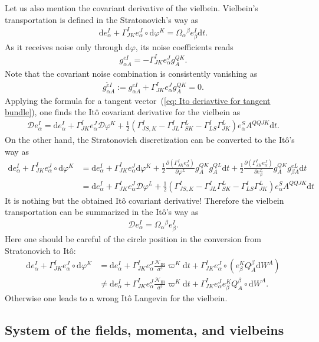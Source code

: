 \documentclass[aps, prd
, preprint
, nofootinbib 
, longbibliography
]{revtex4-1}
\newcommand{\pdif}[2]{\frac{\partial #1}{\partial #2}}
\newcommand{\dd}{\mathrm{d}}
\newcommand{\IR}{\mathrm{IR}}
\newcommand{\calD}{\mathcal{D}}
\newcommand{\calN}{\mathcal{N}}
\newcommand{\bae}[1]{\begin{align} #1 \end{align}}
\begin{document}
Let us also mention the covariant derivative of the vielbein.
Vielbein's transportation is defined in the Stratonovich's way as
\bae{
    \dd e^I_\alpha+\Gamma^I_{JK}e^J_\alpha\circ\dd\varphi^K=\Omega_\alpha{}^\beta e^I_\beta\dd t.
}
As it receives noise only through $\dd\varphi$, its noise coefficients reads
\bae{
    g^{eI}_{\alpha A}=-\Gamma^I_{JK}e^J_\alpha g^{QK}_A.
}
Note that the covariant noise combination is consistently vanishing as
\bae{
    g^{\tilde{e}I}_{\alpha A}:=g^{eI}_{\alpha A}+\Gamma^I_{JK}e^J_\alpha g^{QK}_A=0.
}
Applying the formula for a tangent vector~(\ref{eq: Ito deriavtive for tangent bundle}),
one finds the It\^o covariant derivative for the vielbein as
\bae{
    \calD e^I_\alpha=\dd e^I_\alpha+\Gamma^I_{JK}e^J_\alpha\calD\varphi^K+\frac{1}{2}(\Gamma^I_{JS,K}-\Gamma^I_{JL}\Gamma^L_{SK}-\Gamma^I_{LS}\Gamma^L_{JK})e^S_\alpha A^{QQJK}\dd t.
}
On the other hand, the Stratonovich discretization can be converted to the It\^o's way as
\bae{
    \dd e^I_\alpha+\Gamma^I_{JK}e^J_\alpha\circ\dd\varphi^K&=\dd e^I_\alpha+\Gamma^I_{JK}e^J_\alpha\dd\varphi^K+\frac{1}{2}\pdif{(\Gamma^I_{JK}e^J_\alpha)}{\varphi^L}g^{QK}_Ag^{QL}_A\dd t+\frac{1}{2}\pdif{(\Gamma^I_{JK}e^J_\alpha)}{e^L_\beta}g^{QK}_Ag^{eL}_{\beta A}\dd t \nonumber \\
    &=\dd e^I_\alpha+\Gamma^I_{JK}e^J_\alpha\calD\varphi^L+\frac{1}{2}(\Gamma^I_{JS,K}-\Gamma^I_{JL}\Gamma^L_{SK}-\Gamma^I_{LS}\Gamma^L_{JK})e^S_\alpha A^{QQJK}\dd t
}
It is nothing but the obtained It\^o covariant derivative! Therefore the vielbein transportation can be summarized in the It\^o's way as
\bae{
    \calD e^I_\alpha=\Omega_\alpha{}^\beta e^I_\beta.
}
Here one should be careful of the circle position in the conversion from Stratonovich to It\^o:
\bae{
    \dd e^I_\alpha+\Gamma^I_{JK}e^J_\alpha\circ\dd\varphi^K&=\dd e^I_\alpha+\Gamma^I_{JK}e^J_\alpha\frac{\calN_\IR}{a^3}\varpi^K\dd t+\Gamma^I_{JK}e^J_\alpha\circ(e^K_\beta Q^\beta_A\dd W^A) \nonumber \\
    &\neq\dd e^I_\alpha+\Gamma^I_{JK}e^J_\alpha\frac{\calN_\IR}{a^3}\varpi^K\dd t+\Gamma^I_{JK}e^J_\alpha e^K_\beta Q^\beta_A\circ\dd W^A.
}
Otherwise one leads to a wrong It\^o Langevin for the vielbein.


\subsection{System of the fields, momenta, and vielbeins}
\end{document}
